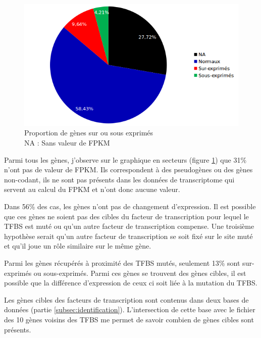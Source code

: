 \begin{figure}[h]
\centering
\includegraphics[scale=0.9]{Figures/Camembert.png}
\captionsetup{justification=centering}
\caption{Proportion de gènes sur ou sous exprimés \\ NA : Sans valeur de FPKM}
\label{fig:cam}
\end{figure}

Parmi tous les gènes, j'observe sur le graphique en secteurs (figure \ref{fig:cam}) que 31\% n'ont pas de valeur de FPKM. Ils correspondent à des pseudogènes ou des gènes non-codant, ils ne sont pas présents dans les données de transcriptome qui servent au calcul du FPKM et n'ont donc aucune valeur.

Dans 56\% des cas, les gènes n'ont pas de changement d'expression. Il est possible que ces gènes ne soient pas des cibles du facteur de transcription pour lequel le TFBS est muté ou qu'un autre facteur de transcription compense. Une troisième hypothèse serait qu'un autre facteur de transcription se soit fixé sur le site muté et qu'il joue un rôle similaire sur le même gène.

Parmi les gènes récupérés à proximité des TFBS mutés, seulement 13\% sont sur-exprimés ou sous-exprimés. Parmi ces gènes se trouvent des gènes cibles, il est possible que la différence d'expression de ceux ci soit liée à la mutation du TFBS.

\newpage
Les gènes cibles des facteurs de transcription sont contenus dans deux bases de données (partie \ref{subsec:identification}). L'intersection de cette base avec le fichier des 10 gènes voisins des TFBS me permet de savoir combien de gènes cibles sont présents.

